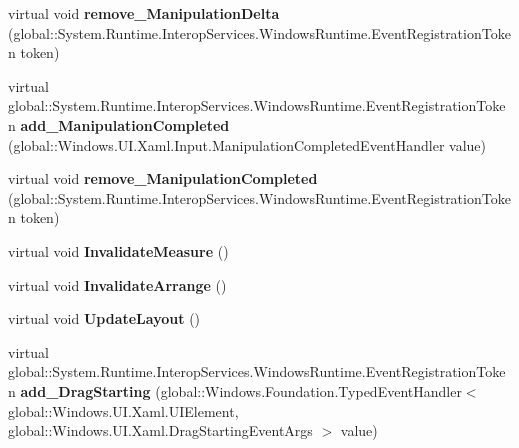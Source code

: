 \begin{DoxyCompactItemize}
\item 
\mbox{\label{class_windows_1_1_u_i_1_1_xaml_1_1_u_i_element_aba1edd03abe3a079446b00630ed5e5ce}} 
virtual void {\bfseries remove\+\_\+\+Manipulation\+Delta} (global\+::\+System.\+Runtime.\+Interop\+Services.\+Windows\+Runtime.\+Event\+Registration\+Token token)
\item 
\mbox{\label{class_windows_1_1_u_i_1_1_xaml_1_1_u_i_element_a977eb5bb8e170069cf88e863a41c5bb5}} 
virtual global\+::\+System.\+Runtime.\+Interop\+Services.\+Windows\+Runtime.\+Event\+Registration\+Token {\bfseries add\+\_\+\+Manipulation\+Completed} (global\+::\+Windows.\+U\+I.\+Xaml.\+Input.\+Manipulation\+Completed\+Event\+Handler value)
\item 
\mbox{\label{class_windows_1_1_u_i_1_1_xaml_1_1_u_i_element_a7c48548622512fe1236390a569a15e25}} 
virtual void {\bfseries remove\+\_\+\+Manipulation\+Completed} (global\+::\+System.\+Runtime.\+Interop\+Services.\+Windows\+Runtime.\+Event\+Registration\+Token token)
\item 
\mbox{\label{class_windows_1_1_u_i_1_1_xaml_1_1_u_i_element_af682a477dc1f76b91d264ebf62e93325}} 
virtual void {\bfseries Invalidate\+Measure} ()
\item 
\mbox{\label{class_windows_1_1_u_i_1_1_xaml_1_1_u_i_element_a7d39da17eef05f2abf010551fe537ef7}} 
virtual void {\bfseries Invalidate\+Arrange} ()
\item 
\mbox{\label{class_windows_1_1_u_i_1_1_xaml_1_1_u_i_element_a6b5438d6f477c2ec1851d0ab5cc2d36c}} 
virtual void {\bfseries Update\+Layout} ()
\item 
\mbox{\label{class_windows_1_1_u_i_1_1_xaml_1_1_u_i_element_aef35e032bc4020dd68c6b12a4b83d69c}} 
virtual global\+::\+System.\+Runtime.\+Interop\+Services.\+Windows\+Runtime.\+Event\+Registration\+Token {\bfseries add\+\_\+\+Drag\+Starting} (global\+::\+Windows.\+Foundation.\+Typed\+Event\+Handler$<$ global\+::\+Windows.\+U\+I.\+Xaml.\+U\+I\+Element, global\+::\+Windows.\+U\+I.\+Xaml.\+Drag\+Starting\+Event\+Args $>$ value)

\end{DoxyCompactItemize}
